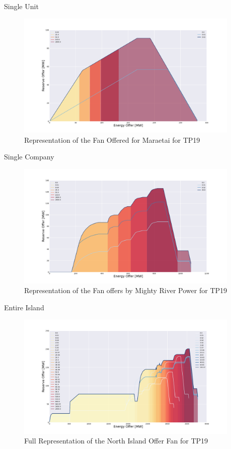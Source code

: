 \documentclass[xcolor=x11names,compress]{beamer}
\renewcommand{\(}{\begin{columns}}
\renewcommand{\)}{\end{columns}}
\newcommand{\<}[1]{\begin{column}{#1}}
\renewcommand{\>}{\end{column}}
\begin{document}
\begin{frame}{Single Unit}
\begin{figure}
\includegraphics[width=0.95\textwidth]{img/mti_station_fan.png}
\caption{Representation of the Fan Offered for Maraetai for TP19}
\end{figure}
\end{frame}

\begin{frame}{Single Company}
\begin{figure}
\includegraphics[width=0.95\textwidth]{img/mrpl_fan_curve.png}
\caption{Representation of the Fan offers by Mighty River Power for TP19}
\end{figure}
\end{frame}

\begin{frame}{Entire Island}
\begin{figure}
\includegraphics[width=0.95\textwidth]{img/full_ni_fan.png}
\caption{Full Representation of the North Island Offer Fan for TP19}
\end{figure}
\end{frame}
\end{document}
